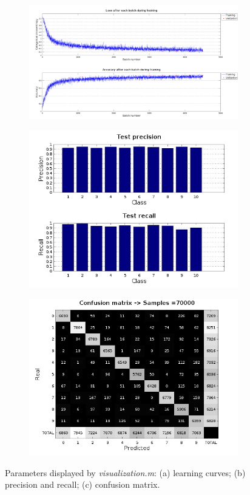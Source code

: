 \begin{figure}
	\centering
	\begin{subfigure}{1\textwidth}
		\centering
		\includegraphics[width=1\linewidth]{figures/learning_curves.png}
		\caption{}
	\end{subfigure}
	\begin{subfigure}{0.5\textwidth}
		\centering
		\includegraphics[width=0.9\linewidth]{figures/prec_rec.png}
		\caption{}
	\end{subfigure}%
	\begin{subfigure}{0.5\textwidth}
		\centering
		\includegraphics[width=0.9\linewidth]{figures/conf_mat.png}
		\caption{}
	\end{subfigure}
	\caption{Parameters displayed by \textit{visualization.m}: (a) learning curves; (b) precision and recall; (c) confusion matrix.}
	\label{fig:benchmark}
\end{figure}

